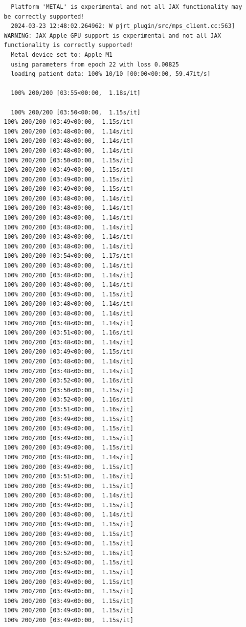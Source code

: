 \documentclass[a4paper, 11pt]{article}
\begin{document}
\begin{verbatim}
  Platform 'METAL' is experimental and not all JAX functionality may be correctly supported!
  2024-03-23 12:48:02.264962: W pjrt_plugin/src/mps_client.cc:563] WARNING: JAX Apple GPU support is experimental and not all JAX functionality is correctly supported!
  Metal device set to: Apple M1
  using parameters from epoch 22 with loss 0.00825
  loading patient data: 100% 10/10 [00:00<00:00, 59.47it/s]

  100% 200/200 [03:55<00:00,  1.18s/it]

  100% 200/200 [03:50<00:00,  1.15s/it]
100% 200/200 [03:49<00:00,  1.15s/it]
100% 200/200 [03:48<00:00,  1.14s/it]
100% 200/200 [03:48<00:00,  1.14s/it]
100% 200/200 [03:48<00:00,  1.14s/it]
100% 200/200 [03:50<00:00,  1.15s/it]
100% 200/200 [03:49<00:00,  1.15s/it]
100% 200/200 [03:49<00:00,  1.15s/it]
100% 200/200 [03:49<00:00,  1.15s/it]
100% 200/200 [03:48<00:00,  1.14s/it]
100% 200/200 [03:48<00:00,  1.14s/it]
100% 200/200 [03:48<00:00,  1.14s/it]
100% 200/200 [03:48<00:00,  1.14s/it]
100% 200/200 [03:48<00:00,  1.14s/it]
100% 200/200 [03:48<00:00,  1.14s/it]
100% 200/200 [03:54<00:00,  1.17s/it]
100% 200/200 [03:48<00:00,  1.14s/it]
100% 200/200 [03:48<00:00,  1.14s/it]
100% 200/200 [03:48<00:00,  1.14s/it]
100% 200/200 [03:49<00:00,  1.15s/it]
100% 200/200 [03:48<00:00,  1.14s/it]
100% 200/200 [03:48<00:00,  1.14s/it]
100% 200/200 [03:48<00:00,  1.14s/it]
100% 200/200 [03:51<00:00,  1.16s/it]
100% 200/200 [03:48<00:00,  1.14s/it]
100% 200/200 [03:49<00:00,  1.15s/it]
100% 200/200 [03:48<00:00,  1.14s/it]
100% 200/200 [03:48<00:00,  1.14s/it]
100% 200/200 [03:52<00:00,  1.16s/it]
100% 200/200 [03:50<00:00,  1.15s/it]
100% 200/200 [03:52<00:00,  1.16s/it]
100% 200/200 [03:51<00:00,  1.16s/it]
100% 200/200 [03:49<00:00,  1.15s/it]
100% 200/200 [03:49<00:00,  1.15s/it]
100% 200/200 [03:49<00:00,  1.15s/it]
100% 200/200 [03:49<00:00,  1.15s/it]
100% 200/200 [03:48<00:00,  1.14s/it]
100% 200/200 [03:49<00:00,  1.15s/it]
100% 200/200 [03:51<00:00,  1.16s/it]
100% 200/200 [03:49<00:00,  1.15s/it]
100% 200/200 [03:48<00:00,  1.14s/it]
100% 200/200 [03:49<00:00,  1.15s/it]
100% 200/200 [03:48<00:00,  1.14s/it]
100% 200/200 [03:49<00:00,  1.15s/it]
100% 200/200 [03:49<00:00,  1.15s/it]
100% 200/200 [03:49<00:00,  1.15s/it]
100% 200/200 [03:52<00:00,  1.16s/it]
100% 200/200 [03:49<00:00,  1.15s/it]
100% 200/200 [03:49<00:00,  1.15s/it]
100% 200/200 [03:49<00:00,  1.15s/it]
100% 200/200 [03:49<00:00,  1.15s/it]
100% 200/200 [03:49<00:00,  1.15s/it]
100% 200/200 [03:49<00:00,  1.15s/it]
100% 200/200 [03:49<00:00,  1.15s/it]

\end{verbatim}
\end{document}
